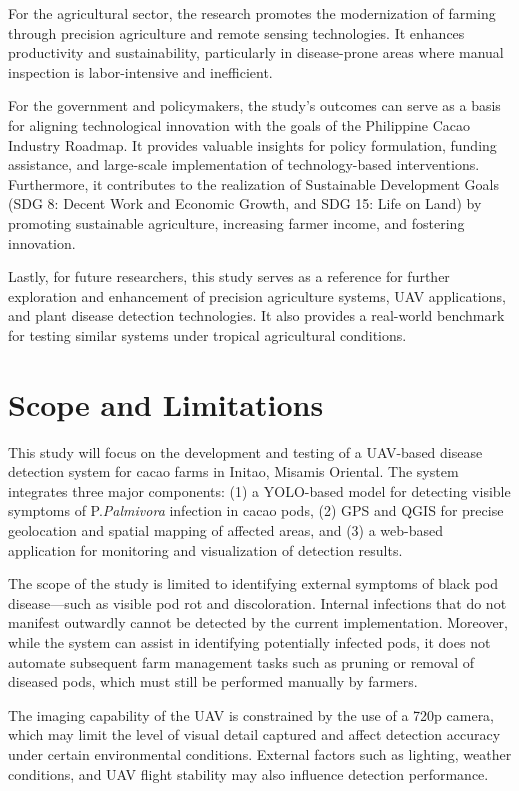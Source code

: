 {For the agricultural sector, the research promotes the modernization of farming through precision agriculture and remote sensing technologies. It enhances productivity and sustainability, particularly in disease-prone areas where manual inspection is labor-intensive and inefficient.

For the government and policymakers, the study’s outcomes can serve as a basis for aligning technological innovation with the goals of the Philippine Cacao Industry Roadmap. It provides valuable insights for policy formulation, funding assistance, and large-scale implementation of technology-based interventions. Furthermore, it contributes to the realization of Sustainable Development Goals (SDG 8: Decent Work and Economic Growth, and SDG 15: Life on Land) by promoting sustainable agriculture, increasing farmer income, and fostering innovation.

Lastly, for future researchers, this study serves as a reference for further exploration and enhancement of precision agriculture systems, UAV applications, and plant disease detection technologies. It also provides a real-world benchmark for testing similar systems under tropical agricultural conditions.

\section{Scope and Limitations}
This study will focus on the development and testing of a UAV-based disease detection system for cacao farms in Initao, Misamis Oriental. The system integrates three major components: (1) a YOLO-based model for detecting visible symptoms of P.\textit{Palmivora} infection in cacao pods, (2) GPS and QGIS for precise geolocation and spatial mapping of affected areas, and (3) a web-based application for monitoring and visualization of detection results.

The scope of the study is limited to identifying external symptoms of black pod disease—such as visible pod rot and discoloration. Internal infections that do not manifest outwardly cannot be detected by the current implementation. Moreover, while the system can assist in identifying potentially infected pods, it does not automate subsequent farm management tasks such as pruning or removal of diseased pods, which must still be performed manually by farmers.

The imaging capability of the UAV is constrained by the use of a 720p camera, which may limit the level of visual detail captured and affect detection accuracy under certain environmental conditions. External factors such as lighting, weather conditions, and UAV flight stability may also influence detection performance.

}
